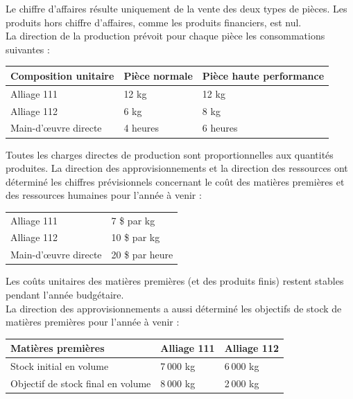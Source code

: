 \documentclass{tufte-handout}
\begin{document}
\begin{enumerate}
Le chiffre d’affaires résulte uniquement de la vente des deux types de pièces. Les produits hors chiffre d’affaires, comme les produits financiers, est nul.\\

La direction de la production prévoit pour chaque pièce les consommations suivantes :\\
\begin{center}
\begin{tabular}{lll}
Composition unitaire & Pièce normale & Pièce haute performance\\
\hline
Alliage 111 & 12 kg & 12 kg\\
Alliage 112 & 6 kg & 8 kg\\
Main-d'œuvre directe & 4 heures & 6 heures\\
\end{tabular}
\end{center}

Toutes les charges directes de production sont proportionnelles aux quantités produites. La direction des approvisionnements et la direction des ressources ont déterminé les chiffres prévisionnels concernant le coût des matières premières et des ressources humaines pour l'année à venir :\\
\begin{center}
\begin{tabular}{ll}
Alliage 111 & 7 \$ par kg\\
Alliage 112 & 10 \$ par kg\\
Main-d’œuvre directe & 20 \$ par heure\\
\end{tabular}
\end{center}
Les coûts unitaires des matières premières (et des produits finis) restent stables pendant l’année budgétaire.\\

La direction des approvisionnements a aussi déterminé les objectifs de stock de matières premières pour l'année à venir :\\
\begin{center}
\begin{tabular}{lll}
Matières premières & Alliage 111 & Alliage 112\\
\hline
Stock initial en volume & 7 000 kg & 6 000 kg\\
Objectif de stock final en volume & 8 000 kg & 2 000 kg\\
\end{tabular}
\end{center}


\end{enumerate}
\end{document}
